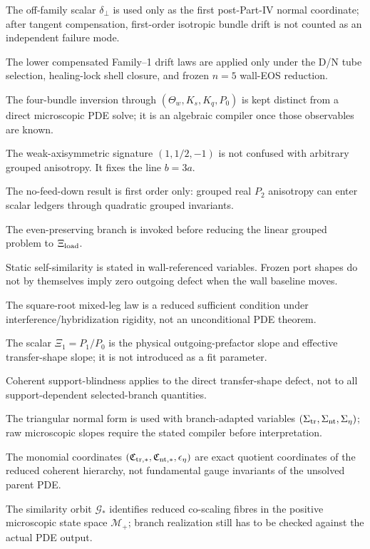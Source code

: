 \begin{verificationchecklist}
\item The off-family scalar \(\delta_\perp\) is used only as the first post-Part-IV normal coordinate; after tangent compensation, first-order isotropic bundle drift is not counted as an independent failure mode.
\item The lower compensated Family--1 drift laws are applied only under the D/N tube selection, healing-lock shell closure, and frozen \(n=5\) wall-EOS reduction.
\item The four-bundle inversion through \((\Theta_w,K_s,K_q,P_0)\) is kept distinct from a direct microscopic PDE solve; it is an algebraic compiler once those observables are known.
\item The weak-axisymmetric signature \((1,1/2,-1)\) is not confused with arbitrary grouped anisotropy.  It fixes the line \(b=3a\).
\item The no-feed-down result is first order only: grouped real \(P_2\) anisotropy can enter scalar ledgers through quadratic grouped invariants.
\item The even-preserving branch is invoked before reducing the linear grouped problem to \(\Xi_{\rm load}\).
\item Static self-similarity is stated in wall-referenced variables.  Frozen port shapes do not by themselves imply zero outgoing defect when the wall baseline moves.
\item The square-root mixed-leg law is a reduced sufficient condition under interference/hybridization rigidity, not an unconditional PDE theorem.
\item The scalar \(\Xi_1=P_1/P_0\) is the physical outgoing-prefactor slope and effective transfer-shape slope; it is not introduced as a fit parameter.
\item Coherent support-blindness applies to the direct transfer-shape defect, not to all support-dependent selected-branch quantities.
\item The triangular normal form is used with branch-adapted variables \((\Sigma_{\rm tr},\Sigma_{\rm nt},\Sigma_\eta)\); raw microscopic slopes require the stated compiler before interpretation.
\item The monomial coordinates \((\mathfrak C_{{\rm tr},*},\mathfrak C_{{\rm nt},*},\epsilon_\eta)\) are exact quotient coordinates of the reduced coherent hierarchy, not fundamental gauge invariants of the unsolved parent PDE.
\item The similarity orbit \(\mathcal G_*\) identifies reduced co-scaling fibres in the positive microscopic state space \(\mathcal M_+\); branch realization still has to be checked against the actual PDE output.

\end{verificationchecklist}
